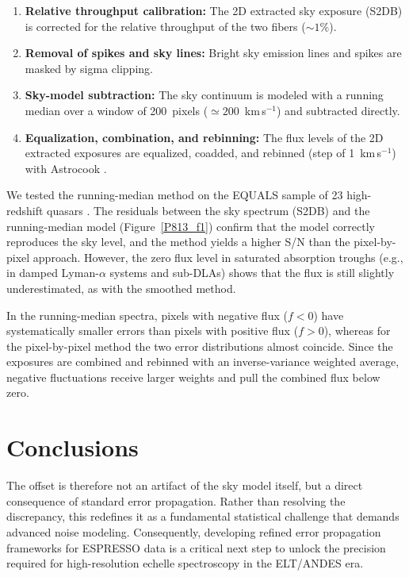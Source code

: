 \documentclass[11pt,twoside]{article}
\begin{document}
\begin{enumerate}
    \item \textbf{Relative throughput calibration:} The 2D extracted sky exposure (S2DB) is corrected for the relative throughput of the two fibers ($\sim1\%$).
    \item \textbf{Removal of spikes and sky lines:} Bright sky emission lines and spikes are masked by sigma clipping.
    \item \textbf{Sky-model subtraction:} The sky continuum is modeled with a running median over a window of 200~pixels ($\simeq200$~km\,s$^{-1}$) and subtracted directly.
    \item \textbf{Equalization, combination, and rebinning:} The flux levels of the 2D extracted exposures are equalized, coadded, and rebinned (step of 1~km\,s$^{-1}$) with Astrocook \citep{cupani+20}.
\end{enumerate}

We tested the running-median method on the EQUALS sample of 23 high-redshift quasars \citep[$z\sim3$--4;][]{berg+25}. The residuals between the sky spectrum (S2DB) and the running-median model (Figure~\ref{P813_f1}) confirm that the model correctly reproduces the sky level, and the method yields a higher S/N than the pixel-by-pixel approach. However, the zero flux level in saturated absorption troughs (e.g., in damped Lyman-$\alpha$ systems and sub-DLAs) shows that the flux is still slightly underestimated, as with the smoothed method.

In the running-median spectra, pixels with negative flux ($f<0$) have systematically smaller errors than pixels with positive flux ($f>0$), whereas for the pixel-by-pixel method the two error distributions almost coincide. Since the exposures are combined and rebinned with an inverse-variance weighted average, negative fluctuations receive larger weights and pull the combined flux below zero.


\section{Conclusions}
The offset is therefore not an artifact of the sky model itself, but a direct consequence of standard error propagation. Rather than resolving the discrepancy, this redefines it as a fundamental statistical challenge that demands advanced noise modeling. Consequently, developing refined error propagation frameworks for ESPRESSO data is a critical next step to unlock the precision required for high-resolution echelle spectroscopy in the ELT/ANDES era.


\end{document}
